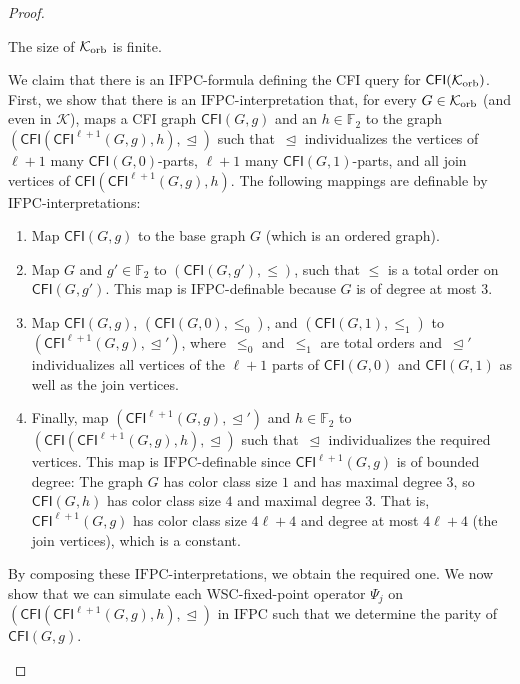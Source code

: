 \documentclass[]{lmcs}
\newcommand{\FF}{\mathbb{F}}
\newcommand{\formB}{\Psi}
\newcommand{\GraphClass}{\mathcal{K}}
\newcommand{\IFPC}{\ensuremath{\mathrm{IFPC}}}
\newcommand{\CFImk}[2]{\mathsf{CFI}^{#1}(#2)}
\newcommand{\CFIsym}{\mathsf{CFI}}
\newcommand{\CFI}[1]{\CFIsym(#1)}
\newcommand{\indRel}{\trianglelefteq}
\newenvironment{claimproof}[1][\proofname]{\begin{claimprooftemp}[#1]\renewcommand*{\qedsymbol}{\(\dashv\)}}{\end{claimprooftemp}}
\begin{document}
\begin{proof}
	\begin{clm}
		\label{clm:orb-infinite}
		The size of $\GraphClassOrb$ is finite.
	\end{clm}
	\begin{claimproof}
		We claim that there is an \IFPC{}-formula defining the CFI query for $\CFI{\GraphClassOrb}$.
		First, we show that there is an \IFPC{}-interpretation that,
		for every $G \in \GraphClassOrb$ (and even in $\GraphClass$),
		maps a CFI graph $\CFI{G,g}$ and an $h \in \FF_2$ to the graph $(\CFI{\CFImk{\ell+1}{G,g},h},\indRel)$ such that~$\indRel$ individualizes the vertices of $\ell+1$ many $\CFI{G,0}$-parts,
		$\ell+1$ many $\CFI{G,1}$-parts, and all join vertices of $\CFI{\CFImk{\ell+1}{G,g},h}$.
		The following mappings are definable by \IFPC{}-interpretations:
		\begin{enumerate}[label=(\alph*)]
			\item Map $\CFI{G,g}$ to the base graph $G$ (which is an ordered graph).
			\item Map $G$ and $g'\in \FF_2$ to  $(\CFI{G,g'}, \leq)$, such that $\leq$ is a total order on $\CFI{G,g'}$.
			This map is \IFPC{}-definable because $G$ is of degree at most $3$.
			\item Map $\CFI{G,g}$, $(\CFI{G,0}, \leq_0)$, and $(\CFI{G,1}, \leq_1)$ to $(\CFImk{\ell+1}{G,g}, \indRel')$,
			where~$\leq_0$ and~$\leq_1$ are total orders and~$\indRel'$ individualizes all vertices of the $\ell+1$ parts of
			$\CFI{G,0}$ and $\CFI{G,1}$ as well as the join vertices.
			\item Finally, map $(\CFImk{\ell+1}{G,g}, \indRel')$ and $h\in\FF_2$ to $(\CFI{\CFImk{\ell+1}{G,g},h},\indRel)$ such that~$\indRel$ individualizes the required vertices.
			This map is \IFPC{}-definable since $\CFImk{\ell+1}{G,g}$ is of bounded degree:
			The graph $G$ has color class size $1$ and has maximal degree $3$,
			so $\CFI{G,h}$ has color class size $4$ and maximal degree $3$.
			That is, $\CFImk{\ell+1}{G,g}$ has color class size $4\ell + 4$
			and degree at most $4\ell+ 4$ (the join vertices),
			which is a constant.
		\end{enumerate}
		By composing these \IFPC{}-interpretations, we obtain the required one.
		We now show that we can simulate each WSC-fixed-point operator $\formB_j$
		on $(\CFI{\CFImk{\ell+1}{G,g},h},\indRel)$ in \IFPC{}
		such that we determine the parity of $\CFI{G,g}$. 
		

\end{claimproof}
\end{proof}
\end{document}
